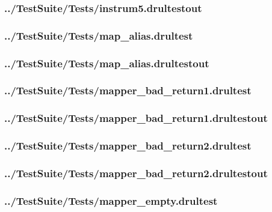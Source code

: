 \begin{changemargin}{-1in}{-1in}
\subsubsection{../TestSuite/Tests/instrum5.drultestout}


\subsubsection{../TestSuite/Tests/map\_alias.drultest}


\subsubsection{../TestSuite/Tests/map\_alias.drultestout}


\subsubsection{../TestSuite/Tests/mapper\_bad\_return1.drultest}


\subsubsection{../TestSuite/Tests/mapper\_bad\_return1.drultestout}


\subsubsection{../TestSuite/Tests/mapper\_bad\_return2.drultest}


\subsubsection{../TestSuite/Tests/mapper\_bad\_return2.drultestout}


\subsubsection{../TestSuite/Tests/mapper\_empty.drultest}



\end{changemargin}
